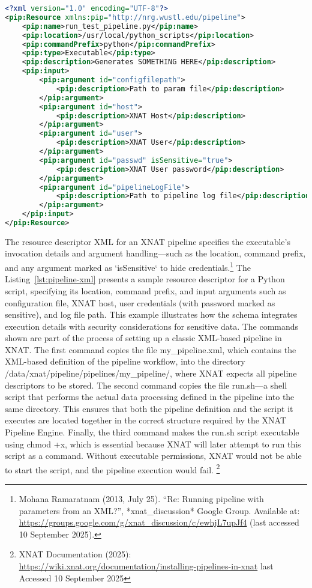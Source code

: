 \begin{lstlisting}[language=XML, caption={Example of a pipeline resource descriptor in XNAT}, label={lst:pipeline-xml}]
<?xml version="1.0" encoding="UTF-8"?>
<pip:Resource xmlns:pip="http://nrg.wustl.edu/pipeline">
    <pip:name>run_test_pipeline.py</pip:name>
    <pip:location>/usr/local/python_scripts</pip:location>
    <pip:commandPrefix>python</pip:commandPrefix>
    <pip:type>Executable</pip:type>
    <pip:description>Generates SOMETHING HERE</pip:description>
    <pip:input>
        <pip:argument id="configfilepath">
            <pip:description>Path to param file</pip:description>
        </pip:argument>
        <pip:argument id="host">
            <pip:description>XNAT Host</pip:description>
        </pip:argument>
        <pip:argument id="user">
            <pip:description>XNAT User</pip:description>
        </pip:argument>
        <pip:argument id="passwd" isSensitive="true">
            <pip:description>XNAT User password</pip:description>
        </pip:argument>
        <pip:argument id="pipelineLogFile">
            <pip:description>Path to pipeline log file</pip:description>
        </pip:argument>
    </pip:input>
</pip:Resource>
\end{lstlisting}
The resource descriptor XML for an XNAT pipeline specifies the executable's invocation details and argument handling—such as the location, command prefix, and any argument marked as `isSensitive` to hide credentials.\footnote{Mohana Ramaratnam (2013, July 25). “Re: Running pipeline with parameters from an XML?”, *xnat\_discussion* Google Group. Available at: \url{https://groups.google.com/g/xnat_discussion/c/ewhjL7upJf4} (last accessed 10 September 2025).}
The  Listing~\ref{lst:pipeline-xml} presents a sample resource descriptor for a Python script, specifying its location, command prefix, and input arguments such as configuration file, XNAT host, user credentials (with password marked as sensitive), and log file path. This example illustrates how the schema integrates execution details with security considerations for sensitive data.
The commands shown are part of the process of setting up a classic XML-based pipeline in XNAT.
The first command copies the file my\_pipeline.xml, which contains the XML-based definition of the pipeline
workflow, into the directory /data/xnat/pipeline/pipelines/my\_pipeline/, where XNAT expects all pipeline
descriptors to be stored.
The second command copies the file run.sh—a shell script that performs the actual data processing defined in the
pipeline into the same directory. This ensures that both the pipeline definition and the script it executes are
located together in the correct structure required by the XNAT Pipeline Engine. Finally, the third command
makes the run.sh script executable using chmod +x, which is essential because XNAT will later attempt to run
this script as a command. Without executable permissions, XNAT would not be able to start the script, and the pipeline execution would fail.
\footnote{XNAT Documentation (2025): \url{https://wiki.xnat.org/documentation/installing-pipelines-in-xnat} last Accessed 10 September 2025}

